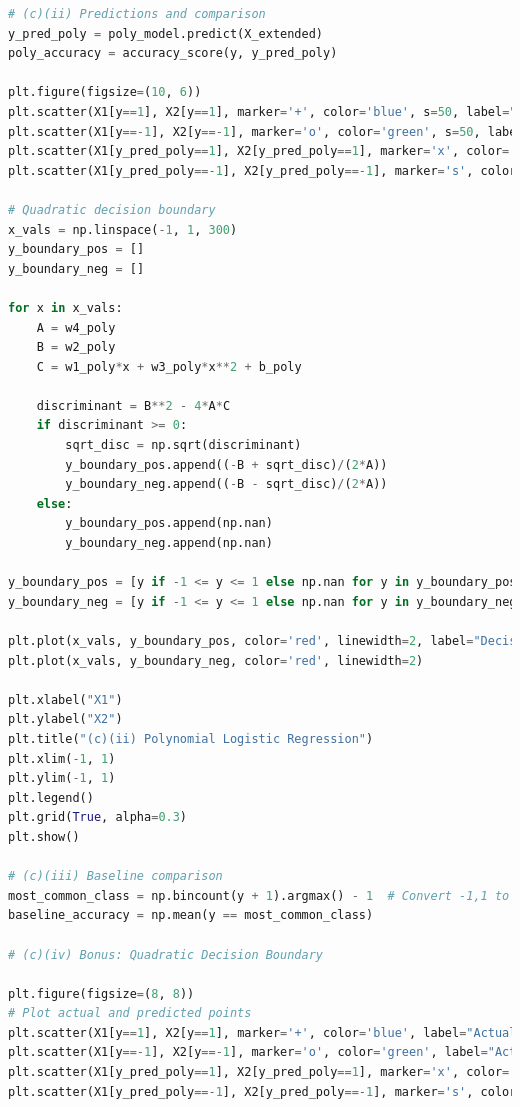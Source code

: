 \documentclass[12pt,a4paper]{article}
\begin{document}
\begin{lstlisting}[language=Python]
# (c)(ii) Predictions and comparison
y_pred_poly = poly_model.predict(X_extended)
poly_accuracy = accuracy_score(y, y_pred_poly)

plt.figure(figsize=(10, 6))
plt.scatter(X1[y==1], X2[y==1], marker='+', color='blue', s=50, label="Actual +1")
plt.scatter(X1[y==-1], X2[y==-1], marker='o', color='green', s=50, label="Actual -1")
plt.scatter(X1[y_pred_poly==1], X2[y_pred_poly==1], marker='x', color='cyan', s=50, label="Predicted +1")
plt.scatter(X1[y_pred_poly==-1], X2[y_pred_poly==-1], marker='s', color='orange', s=50, label="Predicted -1")

# Quadratic decision boundary
x_vals = np.linspace(-1, 1, 300)
y_boundary_pos = []
y_boundary_neg = []

for x in x_vals:
    A = w4_poly
    B = w2_poly
    C = w1_poly*x + w3_poly*x**2 + b_poly
    
    discriminant = B**2 - 4*A*C
    if discriminant >= 0:
        sqrt_disc = np.sqrt(discriminant)
        y_boundary_pos.append((-B + sqrt_disc)/(2*A))
        y_boundary_neg.append((-B - sqrt_disc)/(2*A))
    else:
        y_boundary_pos.append(np.nan)
        y_boundary_neg.append(np.nan)

y_boundary_pos = [y if -1 <= y <= 1 else np.nan for y in y_boundary_pos]
y_boundary_neg = [y if -1 <= y <= 1 else np.nan for y in y_boundary_neg]

plt.plot(x_vals, y_boundary_pos, color='red', linewidth=2, label="Decision Boundary")
plt.plot(x_vals, y_boundary_neg, color='red', linewidth=2)

plt.xlabel("X1")
plt.ylabel("X2")
plt.title("(c)(ii) Polynomial Logistic Regression")
plt.xlim(-1, 1)
plt.ylim(-1, 1)
plt.legend()
plt.grid(True, alpha=0.3)
plt.show()

# (c)(iii) Baseline comparison
most_common_class = np.bincount(y + 1).argmax() - 1  # Convert -1,1 to 0,2 then back
baseline_accuracy = np.mean(y == most_common_class)

# (c)(iv) Bonus: Quadratic Decision Boundary

plt.figure(figsize=(8, 8))
# Plot actual and predicted points
plt.scatter(X1[y==1], X2[y==1], marker='+', color='blue', label="Actual +1", alpha=0.7)
plt.scatter(X1[y==-1], X2[y==-1], marker='o', color='green', label="Actual -1", alpha=0.7)
plt.scatter(X1[y_pred_poly==1], X2[y_pred_poly==1], marker='x', color='cyan', label="Predicted +1", alpha=0.6)
plt.scatter(X1[y_pred_poly==-1], X2[y_pred_poly==-1], marker='s', color='orange', label="Predicted -1", alpha=0.6)


\end{lstlisting}
\end{document}

